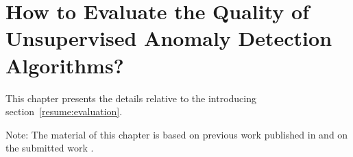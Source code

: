 \chapter{How to Evaluate the Quality of Unsupervised Anomaly Detection Algorithms?}
\label{chap:evaluation}

\begin{chapabstract}
This chapter presents the details relative to the introducing section~\ref{resume:evaluation}.


\end{chapabstract}
Note: The material of this chapter is based on previous work published in \cite{ICMLworkshop16} and on the submitted work \cite{NIPS16evaluation}.
